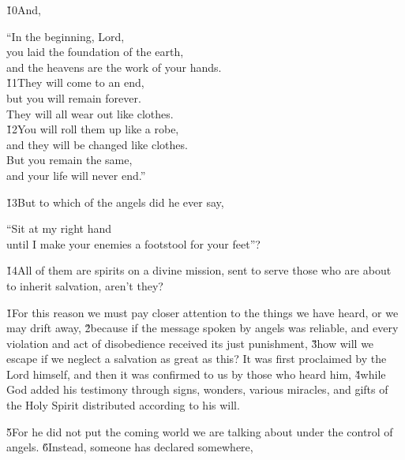 \v{10}And,

\begin{poetry}
\poeml ``In the beginning, Lord, \\
\poemll    you laid the foundation of the earth, \\
\poemlll       and the heavens are the work of your hands. \\
\poeml \v{11}They will come to an end, \\
\poemll    but you will remain forever. \\
\poemlll       They will all wear out like clothes. \\
\poeml \v{12}You will roll them up like a robe, \\
\poemll    and they will be changed like clothes. \\
\poeml But you remain the same, \\
\poemll    and your life will never end.''
\end{poetry}

\v{13}But to which of the angels did he ever say,

\begin{poetry}
\poeml ``Sit at my right hand \\
\poemll    until I make your enemies a footstool for your feet''?
\end{poetry}

\v{14}All of them are spirits on a divine mission, sent to serve those who are about to inherit salvation, aren't they?

\v{1}For this reason we must pay closer attention to the things we have heard, or we may drift away, \v{2}because if the message spoken by angels was reliable, and every violation and act of disobedience received its just punishment, \v{3}how will we escape if we neglect a salvation as great as this? It was first proclaimed by the Lord himself, and then it was confirmed to us by those who heard him, \v{4}while God added his testimony through signs, wonders, various miracles, and gifts of the Holy Spirit distributed according to his will.

\v{5}For he did not put the coming world we are talking about under the control of angels. \v{6}Instead, someone has declared somewhere,

